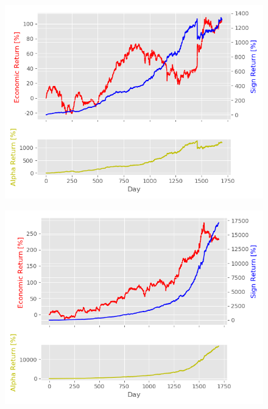 \begin{appendices}
\begin{figure}
\centering
\begin{minipage}{.5\textwidth}
  \centering
  \includegraphics[scale=0.5]{Plot/BucketNumber3ReturnPlot.png}
  \label{fig:test1}
\end{minipage}%
\begin{minipage}{.5\textwidth}
  \centering
  \includegraphics[scale=0.5]{Plot/BucketNumber4ReturnPlot.png}
  \label{fig:test2}
\end{minipage}
\end{figure}


\end{appendices}